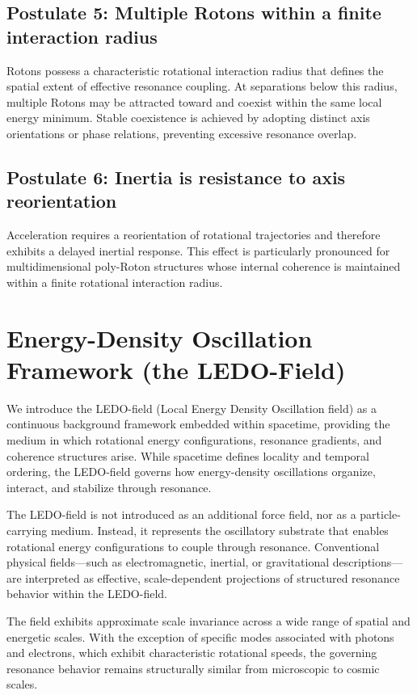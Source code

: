 \documentclass[11pt,a4paper]{article}
\begin{document}
\subsection{Postulate 5: Multiple Rotons within a finite interaction radius}
Rotons possess a characteristic rotational interaction radius that defines the spatial extent of effective resonance coupling. At separations below this radius, multiple Rotons may be attracted toward and coexist within the same local energy minimum. Stable coexistence is achieved by adopting distinct axis orientations or phase relations, preventing excessive resonance overlap.

\subsection{Postulate 6: Inertia is resistance to axis reorientation}
Acceleration requires a reorientation of rotational trajectories and therefore exhibits a delayed inertial response. This effect is particularly pronounced for multidimensional poly-Roton structures whose internal coherence is maintained within a finite rotational interaction radius.


\section{Energy-Density Oscillation Framework (the LEDO-Field)}

We introduce the LEDO-field (Local Energy Density Oscillation field) as a continuous background framework embedded within spacetime, providing the medium in which rotational energy configurations, resonance gradients, and coherence structures arise. While spacetime defines locality and temporal ordering, the LEDO-field governs how energy-density oscillations organize, interact, and stabilize through resonance.

The LEDO-field is not introduced as an additional force field, nor as a particle-carrying medium. Instead, it represents the oscillatory substrate that enables rotational energy configurations to couple through resonance. Conventional physical fields—such as electromagnetic, inertial, or gravitational descriptions—are interpreted as effective, scale-dependent projections of structured resonance behavior within the LEDO-field.

The field exhibits approximate scale invariance across a wide range of spatial and energetic scales. With the exception of specific modes associated with photons and electrons, which exhibit characteristic rotational speeds, the governing resonance behavior remains structurally similar from microscopic to cosmic scales.
\end{document}
